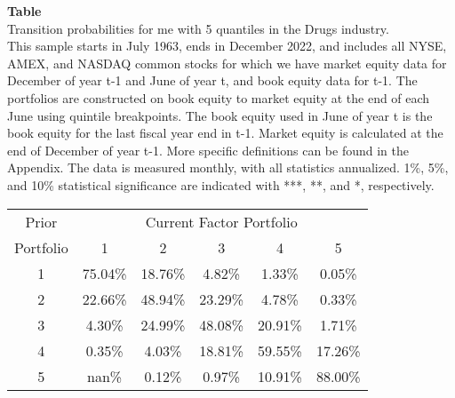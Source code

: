 \begin{table*}[ht!]
\raggedright
{}
\label{tab: transition_probs_me_Drugs_with_5_quantiles}
\textbf{Table \thetable} \\
Transition probabilities for me with 5 quantiles in the Drugs industry. \\
\hspace*{1em}This sample starts in July 1963, ends in December 2022, and includes all NYSE, AMEX, and NASDAQ common stocks for which we have market equity data for December of year t-1 and June of year t, and book equity data for t-1. The portfolios are constructed on book equity to market equity at the end of each June using quintile breakpoints.  The book equity used in June of year t is the book equity for the last fiscal year end in t-1.  Market equity is calculated at the end of December of year t-1.  More specific definitions can be found in the Appendix.  The data is measured monthly, with all statistics annualized.  1\%, 5\%, and 10\% statistical significance are indicated with ***, **, and *, respectively. \\
\vspace{0.5em}
\centering
\begin{adjustbox}{max width=\textwidth}
\begin{tabular}{@{}cccccc@{}}
\toprule
Prior & \multicolumn{5}{c}{Current Factor Portfolio} \\
Portfolio & 1 & 2 & 3 & 4 & 5 \\
\midrule
1 & 75.04\% & 18.76\% & 4.82\% & 1.33\% & 0.05\% \\
2 & 22.66\% & 48.94\% & 23.29\% & 4.78\% & 0.33\% \\
3 & 4.30\% & 24.99\% & 48.08\% & 20.91\% & 1.71\% \\
4 & 0.35\% & 4.03\% & 18.81\% & 59.55\% & 17.26\% \\
5 & nan\% & 0.12\% & 0.97\% & 10.91\% & 88.00\% \\
\bottomrule
\end{tabular}
\end{adjustbox}
\end{table*}